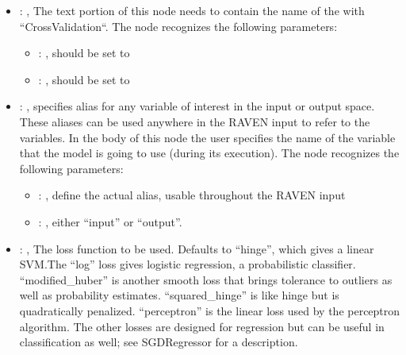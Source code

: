 \begin{itemize}
    \item {}: , 
      The text portion of this node needs to contain the name of the  with
               ``CrossValidation``.
      The  node recognizes the following parameters:
        \begin{itemize}
          \item {}: , 
            should be set to 
          \item {}: , 
            should be set to 
      \end{itemize}

    \item {}: , 
      specifies alias for         any variable of interest in the input or output space. These
      aliases can be used anywhere in the RAVEN input to         refer to the variables. In the body
      of this node the user specifies the name of the variable that the model is going to use
      (during its execution).
      The  node recognizes the following parameters:
        \begin{itemize}
          \item {}: , 
            define the actual alias, usable throughout the RAVEN input
          \item {}: , 
            either ``input'' or ``output''.
      \end{itemize}

    \item {}: , 
      The loss function to be used. Defaults to ``hinge'', which gives a linear SVM.The ``log'' loss
      gives logistic regression, a                                                  probabilistic
      classifier. ``modified\_huber'' is another smooth loss that brings tolerance to outliers as
      well as probability estimates.
      ``squared\_hinge'' is like hinge but is quadratically penalized. ``perceptron'' is the linear
      loss used by the perceptron algorithm.                                                  The
      other losses are designed for regression but can be useful in classification as well; see
      SGDRegressor for a description.


\end{itemize}
